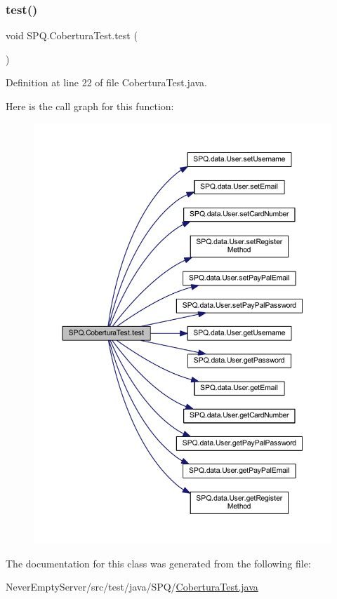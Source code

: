 \subsubsection{\texorpdfstring{test()}{test()}}
{\footnotesize\ttfamily void S\+P\+Q.\+Cobertura\+Test.\+test (\begin{DoxyParamCaption}{ }\end{DoxyParamCaption})}



Definition at line 22 of file Cobertura\+Test.\+java.

Here is the call graph for this function\+:\nopagebreak
\begin{figure}[H]
\begin{center}
\leavevmode
\includegraphics[width=350pt]{class_s_p_q_1_1_cobertura_test_a638bd1485fb908cc3a97cda6f4d8a857_cgraph}
\end{center}
\end{figure}


The documentation for this class was generated from the following file\+:\begin{DoxyCompactItemize}
\item 
Never\+Empty\+Server/src/test/java/\+S\+P\+Q/\mbox{\hyperlink{_cobertura_test_8java}{Cobertura\+Test.\+java}}\end{DoxyCompactItemize}
